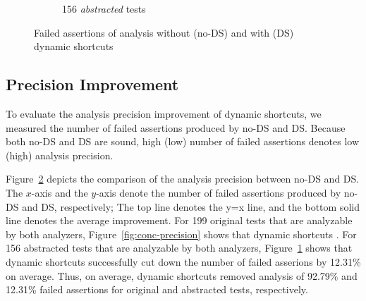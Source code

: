 \begin{figure}[t]
\begin{subfigure}[t]{0.23\textwidth}
    \vspace*{-1.5em}
    \caption{156 \textit{abstracted} tests}
    \label{fig:abs-precision}
  \end{subfigure}
  \vspace*{-1em}
  \caption{Failed assertions of analysis without (no-DS) and with (DS) dynamic shortcuts}
  \label{fig:precision}
  \vspace*{-1.5em}
\end{figure}



\subsection{Precision Improvement}

To evaluate the analysis precision improvement of dynamic shortcuts,
we measured the number of failed assertions produced by no-DS and DS.
Because both no-DS and DS are sound,
high (low) number of failed assertions denotes low (high) analysis precision.

Figure~\ref{fig:precision} depicts the comparison of the analysis
precision between no-DS and DS.  The $x$-axis and the $y$-axis denote
the number of failed assertions produced by no-DS and DS, respectively;
 The top line
denotes the y=x line, and the bottom solid line denotes the average improvement.
For 199 original tests that are analyzable by both analyzers,
Figure~\ref{fig:conc-precision} shows that dynamic shortcuts
.
For 156 abstracted tests that are analyzable by both analyzers,
Figure~\ref{fig:abs-precision} shows that dynamic shortcuts successfully cut down
the number of failed asserions by 12.31\% on average.
Thus, on average, dynamic shortcuts removed analysis of 92.79\% and 12.31\% failed assertions
for original and abstracted tests, respectively.
